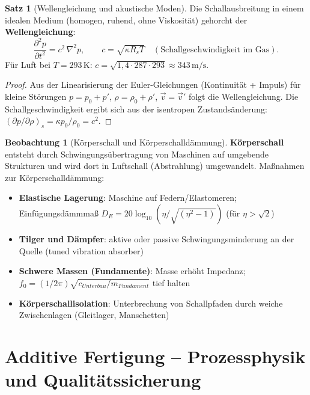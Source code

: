 ﻿\documentclass[a4paper,12pt]{report}
\theoremstyle{definition}
\newtheorem{satz}{Satz}
\newtheorem{beobachtung}{Beobachtung}
\begin{document}
\begin{satz}[Wellengleichung und akustische Moden]
Die Schallausbreitung in einem idealen Medium (homogen, ruhend, ohne Viskosität)
gehorcht der \textbf{Wellengleichung}:
\[
  \frac{\partial^2 p}{\partial t^2} = c^2\,\nabla^2 p,
  \qquad c = \sqrt{\kappa R_s T} \quad (\text{Schallgeschwindigkeit im Gas}).
\]
Für Luft bei $T = 293\,\mathrm{K}$: $c = \sqrt{1{,}4\cdot287\cdot293} \approx 343\,\mathrm{m/s}$.
\end{satz}
\begin{proof}
Aus der Linearisierung der Euler-Gleichungen (Kontinuität + Impuls)
für kleine Störungen $p = p_0 + p'$, $\rho = \rho_0 + \rho'$, $\vec{v} = \vec{v}'$
folgt die Wellengleichung. Die Schallgeschwindigkeit ergibt sich aus der
isentropen Zustandsänderung: $(\partial p/\partial \rho)_s = \kappa p_0/\rho_0 = c^2$.
\end{proof}

\begin{beobachtung}[Körperschall und Körperschalldämmung]
\textbf{Körperschall} entsteht durch Schwingungsübertragung von Maschinen
auf umgebende Strukturen und wird dort in Luftschall (Abstrahlung) umgewandelt.
Maßnahmen zur Körperschalldämmung:
\begin{itemize}
    \item[-] \textbf{Elastische Lagerung}: Maschine auf Federn/Elastomeren;
          Einfügungsdämmmaß $D_E = 20\log_{10}(\eta/\sqrt{(\eta^2-1)})$ (für $\eta > \sqrt{2}$)
    \item[-] \textbf{Tilger und Dämpfer}: aktive oder passive Schwingungsminderung
          an der Quelle (tuned vibration absorber)
    \item[-] \textbf{Schwere Massen (Fundamente)}: Masse erhöht Impedanz;
          $f_0 = (1/2\pi)\sqrt{c_{Unterbau}/m_{Fundament}}$ tief halten
    \item[-] \textbf{Körperschallisolation}: Unterbrechung von Schallpfaden
          durch weiche Zwischenlagen (Gleitlager, Manschetten)
\end{itemize}
\end{beobachtung}

\section{Additive Fertigung -- Prozessphysik und Qualitätssicherung}
\end{document}
